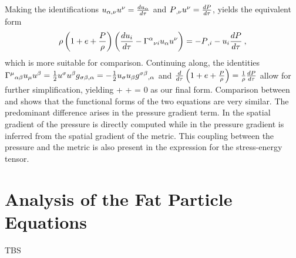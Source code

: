 Making the identifications $ {u}{{}_{\alpha,\nu} }   {u}{{}^{\nu} }  =
 \frac{d  {u}{{}_{\alpha} } }{d \tau}$ and $ {P}{{}_{,\nu} }   {u}{{}^{\nu} } 
=  \frac{d P}{d \tau}$, yields the equivalent form
\[ \rho \left( {1 + e
+ \frac{P}{\rho}} \right) \left( { \frac{d  {u}{{}_{i} } }{d \tau} -
 {\Gamma}{{}^{\alpha} {}_{\nu i} }   {u}{{}_{\alpha} }  u^{\nu} } \right) =
- {P}{{}_{,i} }  -  {u}{{}_{i} }   \frac{d P}{d \tau} \: ,
\]
which is more suitable for comparison.  Continuing along, the
identities $ {\Gamma}{{}^{\mu} {}_{\alpha\beta} }   {u}{{}_{\mu} } 
 {u}{{}^{\beta} }  = \frac{1}{2}  {u}{{}^{\sigma} } 
 {u}{{}^{\beta} }   {g}{{}_{\sigma \beta , \alpha} }  = -\frac{1}{2}  {u}{{}_{\sigma} } 
 {u}{{}_{\beta} }   { {g}{{}^{\sigma \beta} } }{{}_{,\alpha} } $ and $ \frac{d}{d \tau}\left( {1
+ e + \frac{P}{\rho}} \right) = \frac{1}{\rho}  \frac{d P}{d \tau}$ allow for
further simplification, yielding \be\label{eq:Euler_final_form}
\dby{\gt}  +
 
\pvel{\ga}\pvel{\gn} + 
 = 0 \ee as our final form. Comparison between
\sure{\ref{eq:Euler_final_form}} and \sure{\ref{eq:SPHEuler}}
shows that the functional forms of the two equations are very
similar. The predominant difference arises in the pressure
gradient term. In \sure{\ref{eq:Euler_final_form}} the spatial
gradient of the pressure is directly computed while in
\sure{\ref{eq:SPHEuler}} the pressure gradient is inferred from
the spatial gradient of the metric. This coupling between the
pressure and the metric is also present in the expression for the
stress-energy tensor.

\section{Analysis of the Fat Particle Equations}

TBS
